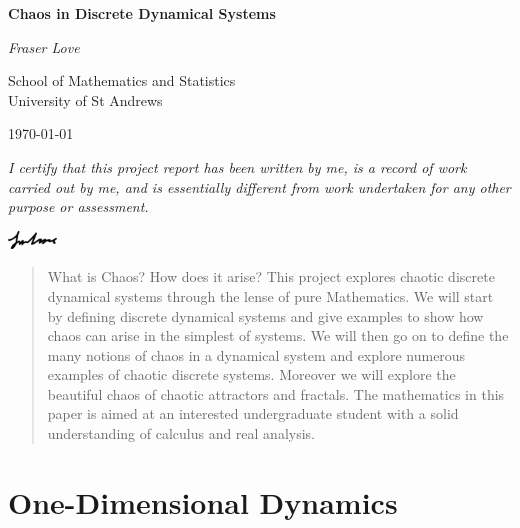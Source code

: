 \documentclass[11pt,a4paper,oneside]{memoir}
\theoremstyle{plain}
\theoremstyle{definition}
\begin{document}
\begin{titlingpage}
    \centering
        \vspace*{3cm}
 
        \Huge
        \textbf{Chaos in Discrete Dynamical Systems}
             
        \vspace{1.5cm}
        
        \LARGE
        \textit{Fraser Love}
             
        \vspace{1.5cm}
             
        \Large
        School of Mathematics and Statistics\\
        University of St Andrews\\

        \vfill

        {\large \today\par}
 \end{titlingpage}

\noindent\textit{I certify that this project report has been written by me, is a record of work carried out by me, and is essentially different from work undertaken for any other purpose or assessment.}

\vspace{0cm}\hspace{12.8cm}\includegraphics[width=1.3cm]{signature}

\begin{abstract}
    \noindent What is Chaos? How does it arise? This project explores chaotic discrete dynamical systems through the lense of pure Mathematics. We will start by defining discrete dynamical systems and give examples to show how chaos can arise in the simplest of systems. We will then go on to define the many notions of chaos in a dynamical system and explore numerous examples of chaotic discrete systems. Moreover we will explore the beautiful chaos of chaotic attractors and fractals. The mathematics in this paper is aimed at an interested undergraduate student with a solid understanding of calculus and real analysis.
\end{abstract}

\tableofcontents

\chapter{One-Dimensional Dynamics}
\end{document}
